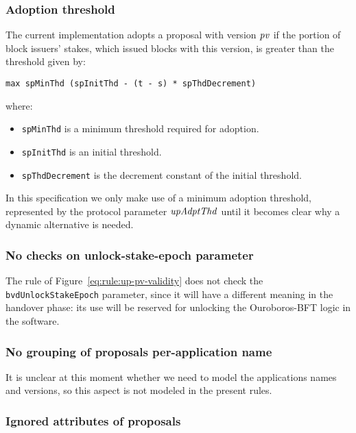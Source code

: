 \subsubsection{Adoption threshold}
\label{sec:adoption-threshold}

The current implementation adopts a proposal with version $\mathit{pv}$ if the
portion of block issuers' stakes, which issued blocks with this version, is
greater than the threshold given by:

\begin{lstlisting}
max spMinThd (spInitThd - (t - s) * spThdDecrement)
\end{lstlisting}

where:
\begin{itemize}
\item \lstinline{spMinThd} is a minimum threshold required for adoption.
\item \lstinline{spInitThd} is an initial threshold.
\item \lstinline{spThdDecrement} is the decrement constant of the initial
  threshold.
\end{itemize}

In this specification we only make use of a minimum adoption threshold,
represented by the protocol parameter $\mathit{upAdptThd}$ until it becomes clear
why a dynamic alternative is needed.

\subsubsection{No checks on unlock-stake-epoch parameter}
\label{sec:no-unlock-stake-epoch-check}

The rule of Figure~\ref{eq:rule:up-pv-validity} does not check the
\lstinline{bvdUnlockStakeEpoch} parameter, since it will have a different
meaning in the handover phase: its use will be reserved for unlocking the
Ouroboros-BFT logic in the software.

\subsubsection{No grouping of proposals per-application name}
\label{sec:no-app-up-grouping}

It is unclear at this moment whether we need to model the applications names
and versions, so this aspect is not modeled in the present rules.

\subsubsection{Ignored attributes of proposals}

